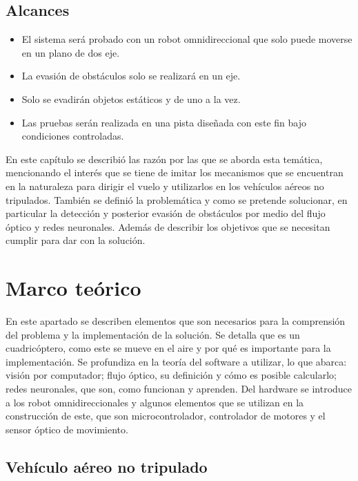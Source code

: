 \documentclass{iccmemoria}
\begin{document}
\section{Alcances}
 
\begin{itemize}
    \item El sistema será probado con un robot omnidireccional que solo puede moverse en un plano de dos eje.
    \item La evasión de obstáculos solo se realizará en un eje.
    \item Solo se evadirán objetos estáticos y de uno a la vez.
    \item Las pruebas serán realizada en una pista diseñada con este fin bajo condiciones controladas.
\end{itemize}

En este capítulo se describió las razón por las que se aborda esta temática, mencionando el interés que se tiene de imitar los mecanismos que se encuentran en la naturaleza para dirigir el vuelo y utilizarlos en los vehículos aéreos no tripulados. También se definió la problemática y como se pretende solucionar, en particular la detección y posterior evasión de obstáculos por medio del flujo óptico y redes neuronales. Además de describir los objetivos que se necesitan cumplir para dar con la solución.\\

\chapter{Marco teórico}

En este apartado se describen elementos que son necesarios para la comprensión del problema y la implementación de la solución. Se detalla que es un cuadricóptero, como este se mueve en el aire y por qué es importante para la implementación. Se profundiza en la teoría del software a utilizar, lo que abarca: visión por computador; flujo óptico, su definición y cómo es posible calcularlo; redes neuronales, que son, como funcionan y aprenden. Del hardware se introduce a los robot omnidireccionales y algunos elementos que se utilizan en la construcción de este, que son microcontrolador, controlador de motores y el sensor óptico de movimiento.\\

\section{Vehículo aéreo no tripulado}\label{sec:uav}
\end{document}
